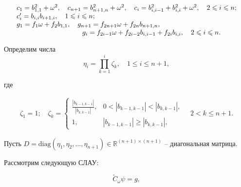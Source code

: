 \begin{gather*}

\begin{array}{l}

c_1 = {b_{1,1}^2 + {\omega}^2}, \quad  c_{n+1} = {b_{n+1,n}^2 + {\omega}^2}, \quad c_i = {b_{i,i-1}^2 + b_{i,i}^2 + {\omega}^2}, \quad  2 \leqslant i \leqslant n; \\

c'_i = {b_{i,i} b_{i+1,i}}, \quad  1 \leqslant i \leqslant n; \\

g_1 = {f_1 \omega + f_2 b_{1,1}}, \quad  g_{n+1} = {f_{2n+1} \omega + f_{2n} b_{n+1,n}}, \\  \hspace{3.4cm}

g_i = {f_{2i-1} \omega + f_{2i-2} b_{i,i-1} + f_{2i} b_{i,i}}, \quad 

2 \leqslant i \leqslant n.

\end{array}

\end{gather*}



Определим числа $$\eta_i =\prod_{k=1}^{i}{\zeta_k},\quad  1 \leqslant i \leqslant {n+1},$$ 

где

\begin{gather*}

\zeta_1 =  1; \quad 

\zeta_k = \left\{

\begin{array}{cr}

\displaystyle \frac{|b_{k-1,k-1}|}{|b_{k,k-1}|}, & 0 < |b_{k-1,k-1}| < |b_{k,k-1}|,

\\

1, & |b_{k-1,k-1}| \geqslant |b_{k,k-1}|,

\end{array}

\right. \quad  2<k\leqslant n+1.

\end{gather*}



Пусть $D = \textrm{diag}(\eta_1, \eta_2, \dots, \eta_{n+1}) \in

{\mathbb{R}}^{(n+1) \times (n+1)}$ \--- диагональная матрица.

Рассмотрим следующую СЛАУ:

\begin{equation}

\label{short weighted system} \widetilde{C}_{\omega} {\psi} = g,

\end{equation}

